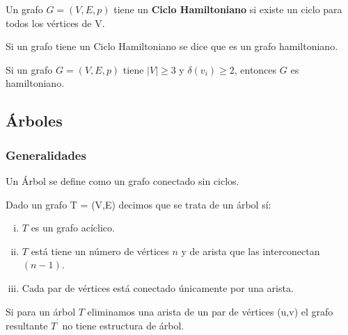 \begin{enumerate}[I.]
{ Un grafo $G = (V,E,p)$ tiene un \textbf{Ciclo Hamiltoniano} si existe un ciclo para 
todos los vértices de V.

{\cor Si un grafo tiene un Ciclo Hamiltoniano se dice que es un grafo 
hamiltoniano.}

{\thm Si un grafo $G = (V,E,p)$  tiene $|V| \geq 3$ y $\delta(v_i) \geq 2$, 
entonces $G$ es hamiltoniano.}

}
\end{enumerate}

\subsection{Árboles}

\subsubsection{Generalidades}

{ Un Árbol se define como un grafo conectado sin ciclos.}

{\thm Dado un grafo T = (V,E) decimos que se trata de un árbol sí:}


\begin{enumerate}[i.]
 
\item $T$ es un grafo acíclico.

\item $T$ está tiene un número de vértices $n$ y de arista que las 
interconectan 
$(n-1)$.

\item Cada par de vértices está conectado únicamente por una arista.

\end{enumerate}

{\cor Si para un árbol $T$ eliminamos una arista de un par de vértices (u,v) el 
grafo resultante $T^{^\prime}$ no tiene estructura de árbol.}



